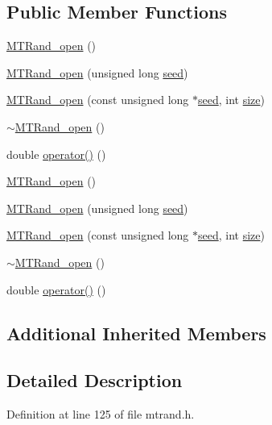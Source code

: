 \subsection*{Public Member Functions}
\begin{DoxyCompactItemize}
\item 
\hyperlink{a00020_a58140b54564be39382da163954177389}{M\-T\-Rand\-\_\-open} ()
\item 
\hyperlink{a00020_a1f55ebc1052f5343f8d6e08a752ef957}{M\-T\-Rand\-\_\-open} (unsigned long \hyperlink{a00019_a0c57076fe30358e0700a7ce1baa0ea27}{seed})
\item 
\hyperlink{a00020_a0216992f4dfa5acf22ee8c585eeac488}{M\-T\-Rand\-\_\-open} (const unsigned long $\ast$\hyperlink{a00019_a0c57076fe30358e0700a7ce1baa0ea27}{seed}, int \hyperlink{a00104_ae113ea7f9e515a12ac4b5595c6faf61e}{size})
\item 
\hyperlink{a00020_a4f4774b5d9b79972dedaec984b248581}{$\sim$\-M\-T\-Rand\-\_\-open} ()
\item 
double \hyperlink{a00020_ac408aa400ca59fc2afc888d88f98d807}{operator()} ()
\item 
\hyperlink{a00020_a58140b54564be39382da163954177389}{M\-T\-Rand\-\_\-open} ()
\item 
\hyperlink{a00020_a1f55ebc1052f5343f8d6e08a752ef957}{M\-T\-Rand\-\_\-open} (unsigned long \hyperlink{a00019_a0c57076fe30358e0700a7ce1baa0ea27}{seed})
\item 
\hyperlink{a00020_a0216992f4dfa5acf22ee8c585eeac488}{M\-T\-Rand\-\_\-open} (const unsigned long $\ast$\hyperlink{a00019_a0c57076fe30358e0700a7ce1baa0ea27}{seed}, int \hyperlink{a00104_ae113ea7f9e515a12ac4b5595c6faf61e}{size})
\item 
\hyperlink{a00020_a4f4774b5d9b79972dedaec984b248581}{$\sim$\-M\-T\-Rand\-\_\-open} ()
\item 
double \hyperlink{a00020_ac408aa400ca59fc2afc888d88f98d807}{operator()} ()
\end{DoxyCompactItemize}
\subsection*{Additional Inherited Members}


\subsection{Detailed Description}


Definition at line 125 of file mtrand.\-h.



